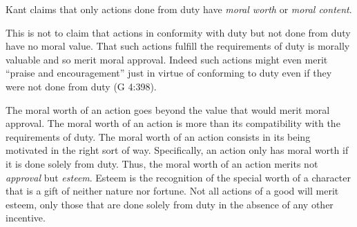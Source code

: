 
Kant claims that only actions done from duty have \emph{moral worth} or \emph{moral content}.

This is not to claim that actions in conformity with duty but not done from duty have no moral value. That such actions fulfill the requirements of duty is morally valuable and so merit moral approval. Indeed such actions might even merit ``praise and encouragement'' just in virtue of conforming to duty even if they were not done from duty (G 4:398).

The moral worth of an action goes beyond the value that would merit moral approval. The moral worth of an action is more than its compatibility with the requirements of duty. The moral worth of an action consists in its being motivated in the right sort of way. Specifically, an action only has moral worth if it is done solely from duty. Thus, the moral worth of an action merits not \emph{approval} but \emph{esteem}. Esteem is the recognition of the special worth of a character that is a gift of neither nature nor fortune. Not all actions of a good will merit esteem, only those that are done solely from duty in the absence of any other incentive. \change

